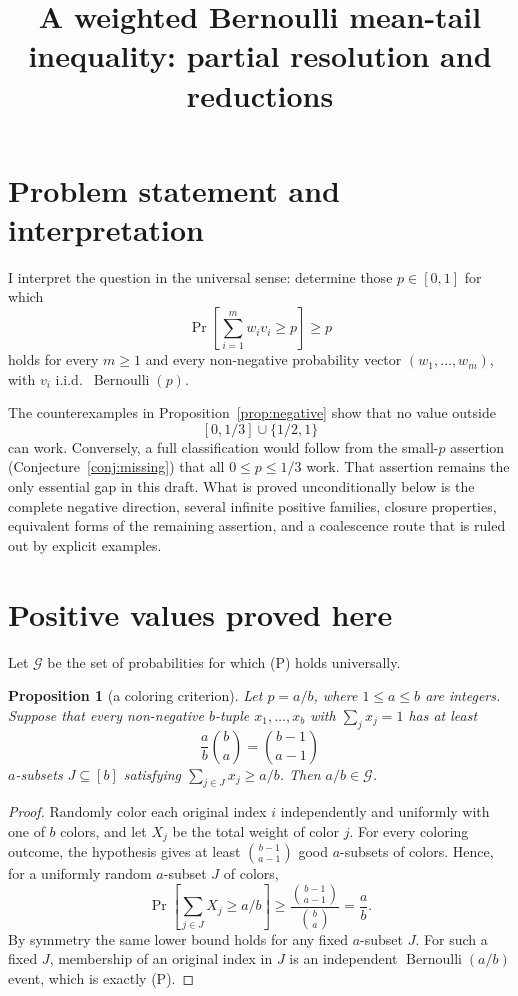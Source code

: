 \documentclass[12pt]{article}
\newtheorem{proposition}{Proposition}
\newcommand{\Ber}{\operatorname{Bernoulli}}
\begin{document}
\title{A weighted Bernoulli mean-tail inequality: partial resolution and reductions}
\author{}
\date{}
\maketitle

\section*{Problem statement and interpretation}

I interpret the question in the universal sense: determine those \(p\in[0,1]\)
for which
\[
        \Pr\!\left[\sum_{i=1}^m w_i v_i\ge p\right]\ge p                  \tag{P}
\]
holds for every \(m\ge1\) and every non-negative probability vector
\((w_1,\ldots,w_m)\), with \(v_i\) i.i.d.\ \(\Ber(p)\).

The counterexamples in Proposition~\ref{prop:negative} show that no value
outside
\[
        [0,1/3]\cup\{1/2,1\}
\]
can work.  Conversely, a full classification would follow from the
small-\(p\) assertion (Conjecture~\ref{conj:missing}) that all
\(0\le p\le1/3\) work.  That assertion remains the only essential gap in this
draft.  What is proved unconditionally below is the complete negative direction,
several infinite positive families, closure properties, equivalent forms of the
remaining assertion, and a coalescence route that is ruled out by explicit
examples.

\section*{Positive values proved here}

Let \(\mathcal G\) be the set of probabilities for which (P) holds universally.

\begin{proposition}[a coloring criterion]\label{prop:criterion}
Let \(p=a/b\), where \(1\le a\le b\) are integers.  Suppose that every
non-negative \(b\)-tuple \(x_1,\ldots,x_b\) with \(\sum_j x_j=1\) has at least
\[
        \frac{a}{b}\binom ba=\binom{b-1}{a-1}
\]
\(a\)-subsets \(J\subseteq[b]\) satisfying \(\sum_{j\in J}x_j\ge a/b\).  Then
\(a/b\in\mathcal G\).
\end{proposition}

\begin{proof}
Randomly color each original index \(i\) independently and uniformly with one
of \(b\) colors, and let \(X_j\) be the total weight of color \(j\).  For every
coloring outcome, the hypothesis gives at least \(\binom{b-1}{a-1}\) good
\(a\)-subsets of colors.  Hence, for a uniformly random \(a\)-subset \(J\) of
colors,
\[
       \Pr\!\left[\sum_{j\in J}X_j\ge a/b\right]\ge
       \frac{\binom{b-1}{a-1}}{\binom ba}=\frac ab .
\]
By symmetry the same lower bound holds for any fixed \(a\)-subset \(J\).  For
such a fixed \(J\), membership of an original index in \(J\) is an independent
\(\Ber(a/b)\) event, which is exactly (P).
\end{proof}
\end{document}
